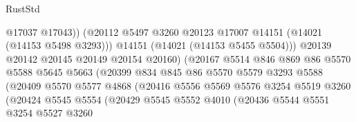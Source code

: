 \begin{lexlean}{RustStd}
\begin{coremodule}
                                        @17037
                                        @17043))
                                    (@20112
                                      @5497
                                      @3260
                                      @20123
                                      @17007
                                      @14151
                                      (@14021 (@14153 @5498 @3293)))
                                    @14151
                                    (@14021 (@14153 @5455 @5504)))
                                  @20139
                                  @20142
                                  @20145
                                  @20149
                                  @20154
                                  @20160)
                                (@20167
                                  @5514
                                  @846
                                  @869
                                  @86
                                  @5570
                                  @5588
                                  @5645
                                  @5663
                                  (@20399
                                    @834
                                    @845
                                    @86
                                    @5570
                                    @5579
                                    @3293
                                    @5588
                                    (@20409
                                      @5570
                                      @5577
                                      @4868
                                      (@20416
                                        @5556
                                        @5569
                                        @5576
                                        @3254
                                        @5519
                                        @3260
                                        (@20424
                                          @5545
                                          @5554
                                          (@20429
                                            @5545
                                            @5552
                                            @4010
                                            (@20436
                                              @5544
                                              @5551
                                              @3254
                                              @5527
                                              @3260

\end{coremodule}
\end{lexlean}
